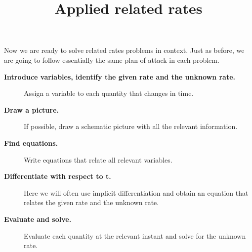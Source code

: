 \documentclass{ximera}
\title{Applied related rates}
\begin{document}
	\begin{abstract}

	\end{abstract}
	\maketitle
	
	Now we are ready to solve related rates problems in context. Just as
	before, we are going to follow essentially the same plan of attack in
	each problem.
	
	
	\begin{description}
		\item[\textbf{Introduce variables, identify the given rate and the unknown rate.}] Assign a variable to each quantity that changes in time.
		\item[\textbf{Draw a picture.}] If possible, draw a schematic picture with all the relevant information. 
		\item[\textbf{Find equations.}] Write equations that relate all
		relevant variables.
		\item[\textbf{Differentiate with respect to t.}] Here we will often use
		implicit differentiation and obtain an equation that relates the given rate and the unknown rate. 
		\item[\textbf{Evaluate and solve.}] Evaluate
		each quantity at the relevant instant and solve for the unknown rate.
		
	\end{description}
	
	
	
	
\end{document}
